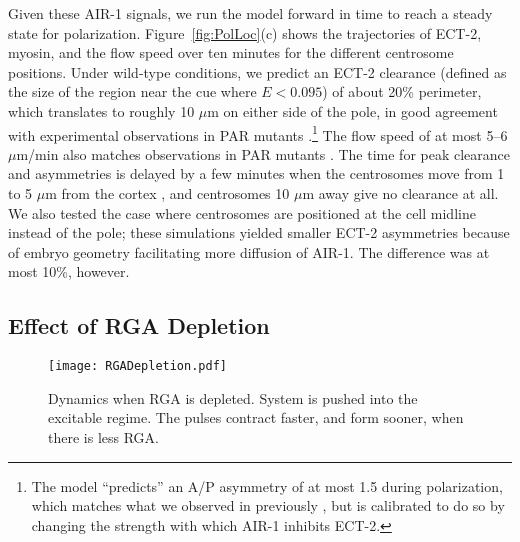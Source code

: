 \documentclass[11pt]{article}
\begin{document}
Given these AIR-1 signals, we run the model forward in time to reach a steady state for polarization. Figure\ \ref{fig:PolLoc}(c) shows the trajectories of ECT-2, myosin, and the flow speed over ten minutes for the different centrosome positions. Under wild-type conditions, we predict an ECT-2 clearance (defined as the size of the region near the cue where $E < 0.095$) of about 20\% perimeter, which translates to roughly 10 $\mu$m on either side of the pole, in good agreement with experimental observations in PAR mutants \citep[Fig.~2E]{gross2019guiding}.\footnote{The model ``predicts'' an A/P asymmetry of at most 1.5 during polarization, which matches what we observed in previously \citep[Fig.~1]{longhini2022aurora}, but is calibrated to do so by changing the strength with which AIR-1 inhibits ECT-2.} The flow speed of at most 5--6 $\mu$m/min also matches observations in PAR mutants \citep[Fig.~2G]{gross2019guiding}. The time for peak clearance and asymmetries is delayed by a few minutes when the centrosomes move from 1 to 5 $\mu$m from the cortex \citep[Fig.~3F]{bienkowska2012centrosomes}, and centrosomes 10 $\mu$m away give no clearance at all. We also tested the case where centrosomes are positioned at the cell midline instead of the pole; these simulations yielded smaller ECT-2 asymmetries because of embryo geometry facilitating more diffusion of AIR-1. The difference was at most 10\%, however. 

\subsection{Effect of RGA Depletion}
\begin{figure}
\centering
\texttt{[image: RGADepletion.pdf]}
\caption{\label{fig:RGADepl}Dynamics when RGA is depleted. System is pushed into the excitable regime. The pulses contract faster, and form sooner, when there is less RGA.}
\end{figure}
\end{document}
